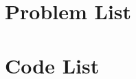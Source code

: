 \documentclass[10pt,titlepage]{ctexart}
\begin{document}

\maketitle


\tableofcontents
\newpage

\begin{appendices}
\section{Problem List}\label{app:problemlist}


\section{Code List}\label{app:codelist}

\end{appendices}

\end{document}
